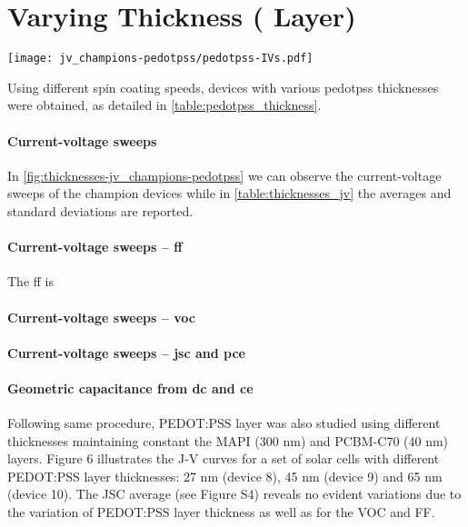 \section{Varying  Thickness ( Layer)}

\begin{SCfigure}
	\centering
	\texttt{[image: jv\_champions-pedotpss/pedotpss-IVs.pdf]}
	\label{fig:thicknesses-jv_champions-pedotpss}
\end{SCfigure}

Using different spin coating speeds, devices with various \gls{pedotpss} thicknesses were obtained, as detailed in \cref{table:pedotpss_thickness}.

\paragraph{Current-voltage sweeps}
In \cref{fig:thicknesses-jv_champions-pedotpss} we can observe the current-voltage sweeps of the champion devices while in \cref{table:thicknesses_jv} the averages and standard deviations are reported.

\paragraph{Current-voltage sweeps -- \gls{ff}}
The \gls{ff} is 

\paragraph{Current-voltage sweeps -- \gls{voc}}

\paragraph{Current-voltage sweeps -- \gls{jsc} and \gls{pce}}

\paragraph{Geometric capacitance from \gls{dc} and \gls{ce}}


Following same procedure, PEDOT:PSS layer was also studied using different thicknesses maintaining constant the MAPI (300 nm) and PCBM-C70 (40 nm) layers.
Figure 6 illustrates the J-V curves for a set of solar cells with different PEDOT:PSS layer thicknesses: 27 nm (device 8), 45 nm (device 9) and 65 nm (device 10). The JSC average (see Figure S4) reveals no evident variations due to the variation of PEDOT:PSS layer thickness as well as for the VOC and FF.

